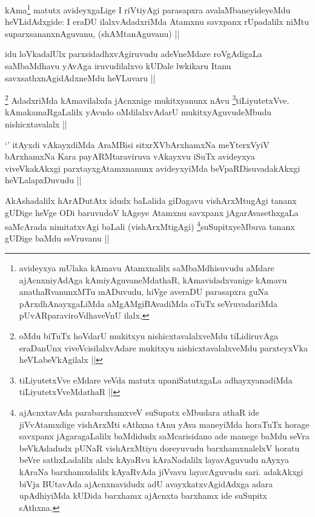 
\begin{artha}
kAma\footnote{avideyxya mUlaka kAmavu Atamxnalilx saMbaMdhisuvudu aMdare ajAcnxniyAdAga kAmiyAguvaneMdathaR, kAmavidadxvanige kAmavu anathaRvanunxMTu mADuvudu, hiVge averaDU parasapxra guNa pArxdhAnayxgaLiMda aMgAMgiBAvadiMda oTuTx seVruvadariMda pUvARparaviroVdhaveVnU ilalx,} matutx avideyxgaLige I riVtiyAgi parasapxra avalaMbaneyideyeMdu heVLidAdxgide: I eraDU ilalxvAdadxriMda Atamxnu savxpanx rUpadalilx niMtu suparxsananxnAguvanu, (shAMtanAguvanu) ||
\end{artha}

\begin{artha}
idu loVkadalUlx parxsidadhxvAgiruvudu adeVneMdare roVgAdigaLa saMbaMdhavu yAvAga iruvudilalxvo kUDale lwkikaru Itanu savxsathxnAgidAdxneMdu heVLuvaru ||
\end{artha}


\begin{artha}
\footnote{oMdu biTuTx hoVdarU mukitxyu nishicxtavalalxveMdu tiLidiruvAga eraDanUnx viveVcisilalxvAdare mukitxyu nishicxtavalalxveMdu parxteyxVka heVLabeVkAgilalx ||}
AdadxriMda kAmavilalxda jAcnxnige mukitxyanunx nAvu \footnote{tiLiyutetxVve eMdare veVda matutx upaniSatutxgaLa adhayxyanadiMda tiLiyutetxVveMdathaR ||}tiLiyutetxVve. kAmakamaRgaLalilx yAvudo oMdilalxvAdarU mukitxyAguvudeMbudu nishicxtavalalx ||
\end{artha}


\begin{artha}
`\stext' itAyxdi vAkayxdiMda AraMBisi sitxrXVbArxhamxNa meYterxVyiV bArxhamxNa Kara payARMtaraviruva vAkayxvu iSuTx avideyxya viveVkakAkxgi parxtayxgAtamxnanunx avideyxyiMda beVpaRDisuvadakAkxgi heVLalapxDuvudu ||
\end{artha}


\begin{artha}
AkAshadalilx hArADutAtx idudx baLalida giDagavu vishArxMtugAgi tananx gUDige heVge ODi baruvudoV hAgeye Atamxnu savxpanx jAgarAvasethxgaLa saMcArada nimitatxvAgi baLali (vishArxMtigAgi) \footnote{ajAcnxtavAda parabarxhamxveV suSupatx eMbudara athaR ide jiVvAtamxdige vishArxMti sAthxna tAnu yAva maneyiMda horaTuTx horage savxpanx jAgaragaLalilx baMdidudx saMcarisidano ade manege baMdu seVra beVkAdadudx pUNaR vishArxMtiyu doreyuvudu barxhamxnalelxV horatu beVre sathxLadalilx alalx kAyaRvu kAraNadalilx layavAguvudu nAyxya kAraNa barxhamxdalilx kAyaRvAda jiVvavu layavAguvudu sari. adakAkxgi biVja BUtavAda ajAcnxnavidudx adU avayxkatxvAgidAdxga adara upAdhiyiMda kUDida barxhamx ajAcnxta barxhamx ide suSupitx sAthxna.}suSupitxyeMbuva tananx gUDige baMdu seVruvanu ||
\end{artha}

